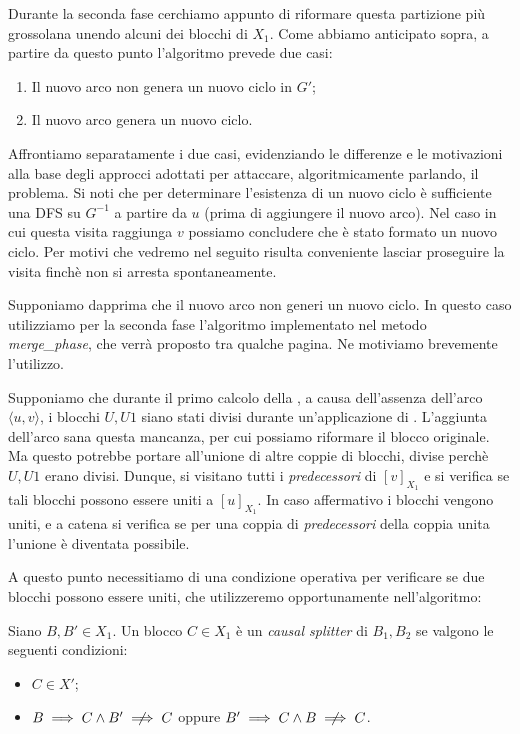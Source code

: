 Durante la seconda fase cerchiamo appunto di riformare questa partizione più grossolana unendo alcuni dei blocchi di $X_1$. Come abbiamo anticipato sopra, a partire da questo punto l'algoritmo prevede due casi:
\begin{enumerate}
    \item Il nuovo arco non genera un nuovo ciclo in $G'$;
    \item Il nuovo arco genera un nuovo ciclo.
\end{enumerate}
Affrontiamo separatamente i due casi, evidenziando le differenze e le motivazioni alla base degli approcci adottati per attaccare, algoritmicamente parlando, il problema. Si noti che per determinare l'esistenza di un nuovo ciclo è sufficiente una DFS su $G^{-1}$ a partire da $u$ (prima di aggiungere il nuovo arco). Nel caso in cui questa visita raggiunga $v$ possiamo concludere che è stato formato un nuovo ciclo. Per motivi che vedremo nel seguito risulta conveniente lasciar proseguire la visita finchè non si arresta spontaneamente.

Supponiamo dapprima che il nuovo arco non generi un nuovo ciclo. In questo caso utilizziamo per la seconda fase l'algoritmo implementato nel metodo \emph{merge\_phase}, che verrà proposto tra qualche pagina. Ne motiviamo brevemente l'utilizzo.

Supponiamo che durante il primo calcolo della \rscpnomath, a causa dell'assenza dell'arco $\langle u, v \rangle$, i blocchi $U,U1$ siano stati divisi durante un'applicazione di \splitfunc. L'aggiunta dell'arco sana questa mancanza, per cui possiamo riformare il blocco originale. Ma questo potrebbe portare all'unione di altre coppie di blocchi, divise perchè $U,U1$ erano divisi. Dunque, si visitano tutti i \emph{predecessori} di $[v]_{X_1}$ e si verifica se tali blocchi possono essere uniti a $[u]_{X_1}$. In caso affermativo i blocchi vengono uniti, e a catena si verifica se per una coppia di \emph{predecessori} della coppia unita l'unione è diventata possibile.

A questo punto necessitiamo di una condizione operativa per verificare se due blocchi possono essere uniti, che utilizzeremo opportunamente nell'algoritmo:

\begin{definition}
    \label{def:causal_splitter}
    Siano $B,B' \in X_1$. Un blocco $C \in X_1$ è un \emph{causal splitter} di $B_1,B_2$ se valgono le seguenti condizioni:
    \begin{itemize}
        \item $C \in X'$;
        \item $B \implies C \land B' \centernot\implies C$ oppure $B' \implies C \land B \centernot\implies C$.
    \end{itemize}
\end{definition}

